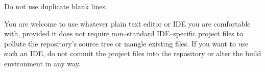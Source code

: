 \item
Do not use duplicate blank lines.
\stopitemize


You are welcome to use whatever plain text editor or IDE you are comfortable with, provided it does not require non--standard IDE--specific project files to pollute the repository's source tree or mangle existing files. If you want to use such an IDE, do not commit the project files into the repository or alter the build environment in any way. 


